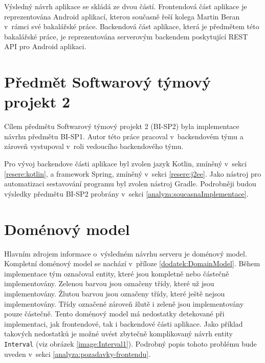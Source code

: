     Výsledný návrh aplikace se skládá ze dvou částí. Frontendová část aplikace je reprezentována Android aplikací, kterou současně řeší kolega Martin Beran v~rámci své bakalářské práce. Backendová část aplikace, která je předmětem této bakalářské práce, je reprezentována serverovým backendem poskytující REST API pro Android aplikaci.


\section{Předmět Softwarový týmový projekt 2}\label{analyza:navrh:sp2}
    Cílem předmětu Softwarový týmový projekt 2 (BI-SP2) byla implementace návrhu předmětu BI-SP1. Autor této práce pracoval v~backendovém týmu a zároveň vystupoval v~roli vedoucího backendového týmu.
    
    Pro vývoj backendove části aplikace byl zvolen jazyk Kotlin, zmíněný v~sekci \ref{resere:kotlin}, a framework Spring, zmíněný v~sekci \ref{resere:j2ee}. Jako nástroj pro automatizaci sestavování programu byl zvolen nástroj Gradle. Podrobněji  budou výsledky předmětu BI-SP2 probrány v~sekci \ref{analyza:soucasnaImplementace}.
        
    
\section{Doménový model}\label{analyza:navrh:DomainModel}
    Hlavním zdrojem informace o~výsledném návrhu serveru je doménový model. Kompletní doménový model se nachází v~příloze \ref{dodatek:DomainModel}. Během implementace tým označoval entity, které jsou kompletně nebo částečně implementovány. Zelenou barvou jsou označeny třídy, které už jsou implementovány. Žlutou barvou jsou označeny třídy, které ještě nejsou implementovány. Třídy označené zároveň žlutě i zeleně jsou implementovány pouze částečně. Tento doménový model má nedostatky detekované při implementaci, jak frontendové, tak i backendové části aplikace. Jako příklad takových nedostatků je možné uvést zbytečně komplikovaný návrh entity \texttt{Interval} (viz obrázek \ref{image:Interval1}). Podrobný popis tohoto problému bude uveden v~sekci \ref{analyza:pozadavky-frontendu}.


